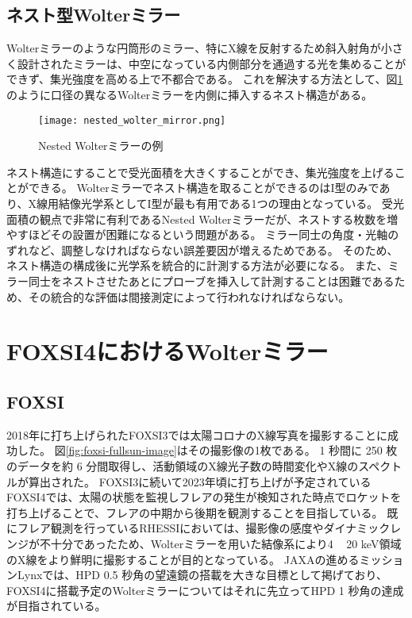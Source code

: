 \subsection{ネスト型Wolterミラー}
\label{chap1_nested_wolter_mirror}

Wolterミラーのような円筒形のミラー、特にX線を反射するため斜入射角が小さく設計されたミラーは、中空になっている内側部分を通過する光を集めることができず、集光強度を高める上で不都合である。
これを解決する方法として、図\ref{fig:nested_wolter_mirror}のように口径の異なるWolterミラーを内側に挿入するネスト構造がある。\cite{BuitragoCasas2017}

\begin{figure}[b]
\centering
\texttt{[image: nested\_wolter\_mirror.png]}
\caption{Nested Wolterミラーの例}
\label{fig:nested_wolter_mirror}
\end{figure}

ネスト構造にすることで受光面積を大きくすることができ、集光強度を上げることができる。
Wolterミラーでネスト構造を取ることができるのはI型のみであり、X線用結像光学系としてI型が最も有用である1つの理由となっている。
受光面積の観点で非常に有利であるNested Wolterミラーだが、ネストする枚数を増やすほどその設置が困難になるという問題がある。
ミラー同士の角度・光軸のずれなど、調整しなければならない誤差要因が増えるためである。
そのため、ネスト構造の構成後に光学系を統合的に計測する方法が必要になる。
また、ミラー同士をネストさせたあとにプローブを挿入して計測することは困難であるため、その統合的な評価は間接測定によって行われなければならない。

\clearpage
\newpage

\section{FOXSI4におけるWolterミラー}
\label{chap1_background}

\subsection{FOXSI}
\label{chap1_foxsi}

2018年に打ち上げられたFOXSI3では太陽コロナのX線写真を撮影することに成功した。\cite{weko_20796_1}
図\ref{fig:foxsi-fullsun-image}はその撮影像の1枚である。
1 秒間に 250 枚のデータを約 6 分間取得し、活動領域のX線光子数の時間変化やX線のスペクトルが算出された。
FOXSI3に続いて2023年頃に打ち上げが予定されているFOXSI4では、太陽の状態を監視しフレアの発生が検知された時点でロケットを打ち上げることで、フレアの中期から後期を観測することを目指している。
既にフレア観測を行っているRHESSI\cite{Liu_2004}においては、撮影像の感度やダイナミックレンジが不十分であったため、Wolterミラーを用いた結像系により4 ~ 20 keV領域のX線をより鮮明に撮影することが目的となっている。\cite{2019AGUFMSH31C3315V}
JAXAの進めるミッションLynxでは、HPD 0.5 秒角の望遠鏡の搭載を大きな目標として掲げており\cite{Gaskin2019}、
FOXSI4に搭載予定のWolterミラーについてはそれに先立ってHPD 1 秒角の達成が目指されている。

